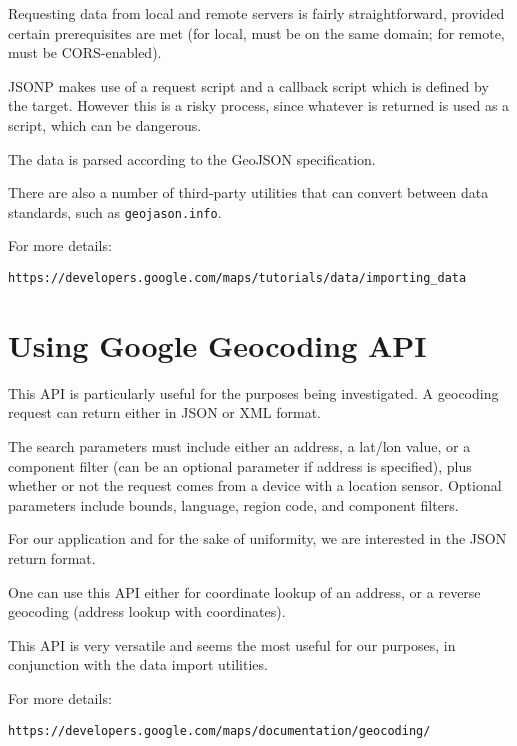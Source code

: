 \documentclass{article}
\begin{document}
Requesting data from local and remote servers is fairly straightforward, provided certain prerequisites are met (for local, must be on the same domain; for remote, must be CORS-enabled).

JSONP makes use of a request script and a callback script which is defined by the target. However this is a risky process, since whatever is returned is used as a script, which can be dangerous.

The data is parsed according to the GeoJSON specification.

There are also a number of third-party utilities that can convert between data standards, such as \texttt{geojason.info}.

For more details:

\noindent\verb#https://developers.google.com/maps/tutorials/data/importing_data#

\section{Using Google Geocoding API}

This API is particularly useful for the purposes being investigated. A geocoding request can return either in JSON or XML format.

The search parameters must include either an address, a lat/lon value, or a component filter (can be an optional parameter if address is specified), plus whether or not the request comes from a device with a location sensor. Optional parameters include bounds, language, region code, and component filters.

For our application and for the sake of uniformity, we are interested in the JSON return format.

One can use this API either for coordinate lookup of an address, or a reverse geocoding (address lookup with coordinates).

This API is very versatile and seems the most useful for our purposes, in conjunction with the data import utilities.

For more details:

\noindent\texttt{https://developers.google.com/maps/documentation/geocoding/}
\end{document}
